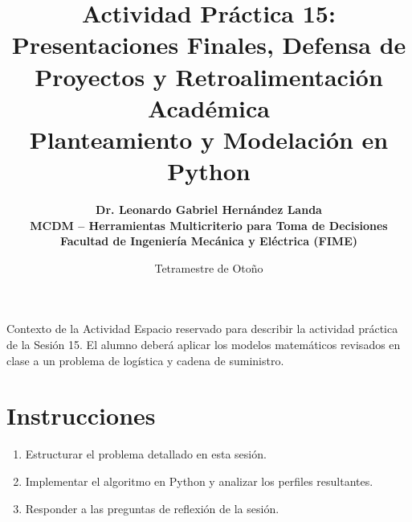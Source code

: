 \documentclass[11pt,a4paper]{article}
\title{%
  \sffamily\bfseries\color{UANLblue}%
  Actividad Práctica 15: Presentaciones Finales, Defensa de Proyectos y Retroalimentación Académica\\
  \large Planteamiento y Modelación en Python
}
\author{%
  \sffamily\bfseries\color{FIMEdarkgray}%
  Dr. Leonardo Gabriel Hernández Landa\\
  \small MCDM -- Herramientas Multicriterio para Toma de Decisiones\\
  \small\color{FIMEgreen}Facultad de Ingeniería Mecánica y Eléctrica (FIME)
}
\date{\sffamily Tetramestre de Otoño}
\begin{document}
\maketitle
\thispagestyle{fancy}

\begin{brandbox}{Contexto de la Actividad}
  Espacio reservado para describir la actividad práctica de la Sesión 15. El alumno deberá aplicar los modelos matemáticos revisados en clase a un problema de logística y cadena de suministro.
\end{brandbox}

\section{Instrucciones}
\begin{enumerate}
    \item Estructurar el problema detallado en esta sesión.
    \item Implementar el algoritmo en Python y analizar los perfiles resultantes.
    \item Responder a las preguntas de reflexión de la sesión.
\end{enumerate}
\end{document}
